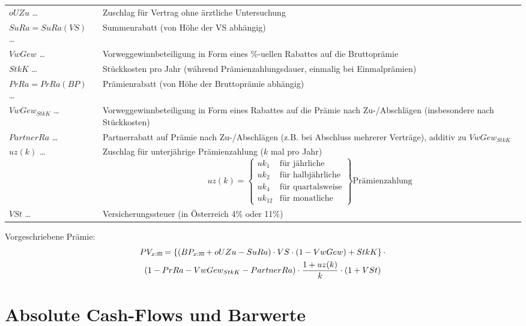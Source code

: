 \documentclass[a4paper,10pt]{article}
\makeatletter
\newcommand{\xn}{{\act[x]{n}}}
\DeclareRobustCommand{\act}[2][]{%
\def\arraystretch{0}%
\setlength\arraycolsep{0.5pt}%
\setlength\arrayrulewidth{0.5pt}%
\setbox0=\hbox{$\scriptstyle#1\ifx#1\empty{asdf}\else:\fi#2$}%
\begin{array}[b]{*2{@{}>{\scriptstyle}c}|}
\cline{2-2}%
\rule[1.25pt]{0pt}{\ht0}%
#1\ifx#1\empty\else:\fi & #2%
\end{array}%
}
\makeatother
\begin{document}
\begin{longtable}{p{4cm}p{11cm}}
 $oUZu$ \dots & Zuschlag für Vertrag ohne ärztliche Untersuchung\\
 $SuRa=SuRa(VS)$ \dots & Summenrabatt (von Höhe der VS abhängig)\\
 $VwGew$ \dots & Vorweggewinnbeteiligung in Form eines \%-uellen Rabattes auf die Bruttoprämie\\
 $StkK$ \dots & Stückkosten pro Jahr (während Prämienzahlungsdauer, einmalig bei Einmalprämien)\\
 $PrRa=PrRa(BP)$ \dots & Prämienrabatt (von Höhe der Bruttoprämie abhängig)\\
 $VwGew_{StkK}$ \dots & Vorweggewinnbeteiligung in Form eines Rabattes auf die Prämie nach Zu-/Abschlägen (insbesondere nach Stückkosten)\\
 $PartnerRa$ \dots & Partnerrabatt auf Prämie nach Zu-/Abschlägen (z.B. bei Abschluss mehrerer Verträge), additiv zu $VwGew_{StkK}$\\
 
 $uz(k)$ \dots & Zuschlag für unterjährige Prämienzahlung ($k$ mal pro Jahr)
 \begin{equation*}
  uz(k)=\left.\begin{cases}uk_1 & \text {für jährliche}\\uk_2 & \text {für halbjährliche} \\ uk_4 & \text{für quartalsweise}\\uk_{12} & \text{für monatliche}\end{cases}\right\} \text{Prämienzahlung}
 \end{equation*}\\
 
 
 $VSt$ \dots & Versicherungssteuer (in Österreich 4\% oder 11\%) \\

\end{longtable}


Vorgeschriebene Prämie:
\begin{multline*}
PV_\xn = \left\{ (BP_\xn + oUZu - SuRa) \cdot VS \cdot (1-VwGew) + StkK\right\} \cdot \\ \left(1-PrRa-VwGew_{StkK}-PartnerRa\right)\cdot \frac{1+uz(k)}{k} \cdot (1+VSt)
% 
\end{multline*}

\section{Absolute Cash-Flows und Barwerte}
\end{document}
